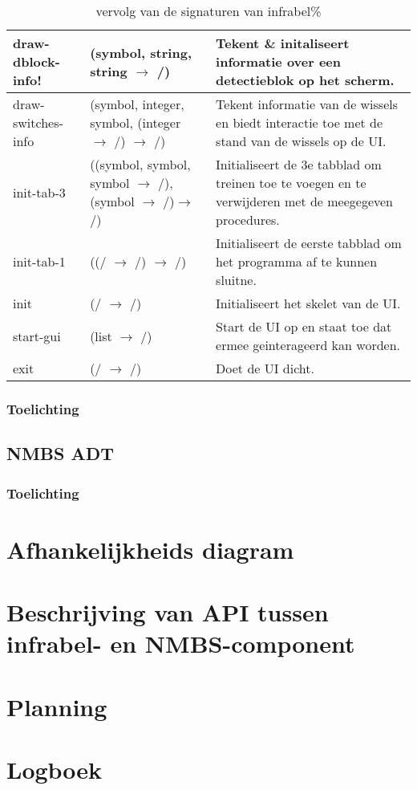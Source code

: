 \documentclass{article}
\begin{document}
\begin{table}[h!]
        \centering
        \begin{tabular}{|p{2.9cm}|p{4cm}|p{6.1cm}|}
                \hline
                draw-dblock-info! & (symbol, string, string $\rightarrow$ /) & Tekent \& initaliseert informatie over een detectieblok op het scherm. \\
                \hline
                draw-switches-info & (symbol, integer, symbol, (integer $\rightarrow$ /) $\rightarrow$ /) & Tekent informatie van de wissels en biedt interactie toe met de stand van de wissels op de UI.\\
                \hline
                init-tab-3 & ((symbol, symbol, symbol $\rightarrow$ /), (symbol $\rightarrow$ /)$\rightarrow$ /) & Initialiseert de 3e tabblad om treinen toe te voegen en te verwijderen met de meegegeven procedures.\\
                \hline
                init-tab-1 & ((/ $\rightarrow$ /) $\rightarrow$ /) & Initialiseert de eerste tabblad om het programma af te kunnen sluitne. \\
                \hline
                init & (/ $\rightarrow$ /) & Initialiseert het skelet van de UI.\\
                \hline
                start-gui & (list $\rightarrow$ /) & Start de UI op en staat toe dat ermee geinterageerd kan worden.\\
                \hline
                exit & (/ $\rightarrow$ /) & Doet de UI dicht.\\
                \hline
        \end{tabular}
        \caption{vervolg van de signaturen van infrabel\%}
\end{table}
\subsubsection{Toelichting}
\subsection{NMBS ADT}
\subsubsection{Toelichting}
\section{Afhankelijkheids diagram}
\section{Beschrijving van API tussen infrabel- en NMBS-component}
\section{Planning}
\section{Logboek}
\end{document}
